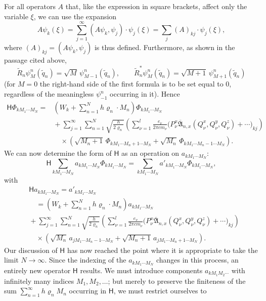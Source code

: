 \documentclass[fontsize=13pt,twoside,openany,headings=normal,parskip=false,bookmarkpackage=false,DIV=calc]{scrbook}
\begin{document}
For all operators $A$ that, like the expression in square brackets, affect only the variable $\xi$, we can use the expansion
\[
 A\psi_k(\xi)=\sum_{j=1}^{\infty}(A\psi_k,\psi_j)\cdot\psi_j(\xi)
 =\sum_j(A)_{kj}\cdot\psi_j(\xi),
\]
where $(A)_{kj}=(A\psi_k,\psi_j)$ is thus defined. Furthermore, as shown in the passage cited above,
\[
 \widetilde R_n\psi_M^n(\widetilde q_n)=\sqrt M\,\psi_{M-1}^n(\widetilde q_n),\qquad
 \widetilde R_n^*\psi_M^n(\widetilde q_n)=\sqrt{M+1}\,\psi_{M+1}^n(\widetilde q_n)
\]
(for $M=0$ the right-hand side of the first formula is to be set equal to $0$, regardless of the meaningless $\psi_{-1}^n$ occurring in it). Hence
\begin{align*}
 \mathsf{H}\Phi_{kM_1\cdots M_N}
 ={}&\left(W_k+\sum_{n=1}^{N}h\varrho_n\cdot M_n\right)\Phi_{kM_1\cdots M_N}\\
 &{}+\sum_{j=1}^{\infty}\sum_{n=1}^{N}\sqrt{\frac h{2\varrho_n}}
 \left(\sum_{\nu=1}^{l}\frac{e_\nu}{2\pi cm_\nu}
 \bigl(P_\nu^x\overline{\mathfrak A}_{n,x}(Q_\nu^x,Q_\nu^y,Q_\nu^z)+\cdots\bigr)_{kj}\right)\\
 &\quad{}\times\left(\sqrt{M_n+1}\,\Phi_{kM_1\cdots M_n+1\cdots M_N}
 +\sqrt{M_n}\,\Phi_{kM_1\cdots M_n-1\cdots M_N}\right).
\end{align*}
We can now determine the form of $\mathsf{H}$ as an operation on $a_{kM_1\cdots M_N}$:
\[
 \mathsf{H}\sum_{kM_1\cdots M_N}a_{kM_1\cdots M_N}\Phi_{kM_1\cdots M_N}
 =\sum_{kM_1\cdots M_N}a'_{kM_1\cdots M_N}\Phi_{kM_1\cdots M_N},
\]
with
\begin{align*}
 &\mathsf{H}a_{kM_1\cdots M_N}=a'_{kM_1\cdots M_N}\\
 &\quad={}\left(W_k+\sum_{n=1}^{N}h\varrho_n\cdot M_n\right)a_{kM_1\cdots M_N}\\
 &{}+\sum_{j=1}^{\infty}\sum_{n=1}^{N}\sqrt{\frac h{2\varrho_n}}
 \left(\sum_{\nu=1}^{l}\frac{e_\nu}{2\pi cm_\nu}
 \bigl(P_\nu^x\overline{\mathfrak A}_{n,x}(Q_\nu^x,Q_\nu^y,Q_\nu^z)+\cdots\bigr)_{kj}\right)\\
 &\quad{}\times\left(\sqrt{M_n}\,a_{jM_1\cdots M_n-1\cdots M_N}
 +\sqrt{M_n+1}\,a_{jM_1\cdots M_n+1\cdots M_N}\right).
\end{align*}
Our discussion of $\mathsf{H}$ has now reached the point where it is appropriate to take the limit $N\longrightarrow\infty$. Since the indexing of the $a_{kM_1\cdots M_N}$ changes in this process, an entirely new operator $\mathsf{H}$ results. We must introduce components $a_{kM_1M_2\cdots}$ with infinitely many indices $M_1,M_2,\ldots$; but merely to preserve the finiteness of the sum $\sum_{n=1}^{\infty}h\varrho_n M_n$ occurring in $\mathsf{H}$, we must restrict ourselves to
\end{document}
